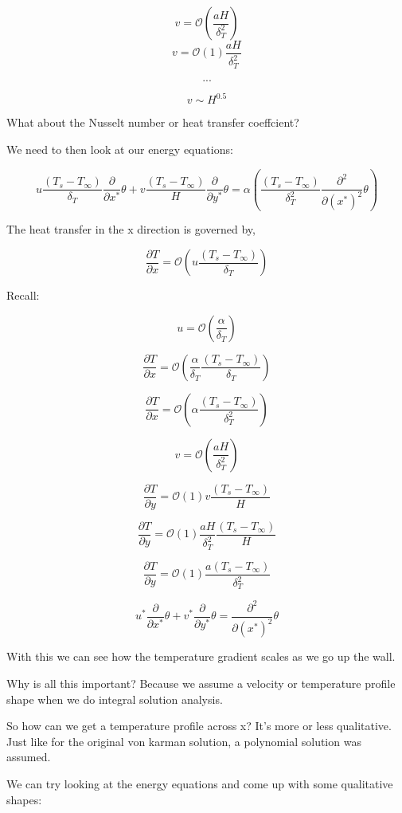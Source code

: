 \documentclass[11pt]{article}
\begin{document}
$$v = \mathcal{O}(\frac{aH}{\delta_T^2})$$
$$v = \mathcal{O}(1)\frac{aH}{\delta_T^2}$$

$$...$$

$$v \sim H^{0.5}$$

What about the Nusselt number or heat transfer coeffcient?

We need to then look at our energy equations:

$$ u \frac{(T_s - T_\infty)}{\delta_T} \frac{\partial}{\partial x^*}\theta + v \frac{(T_s - T_\infty)}{H} \frac{\partial }{\partial y^*}  \theta  = \alpha ( \frac{(T_s - T_\infty)}{\delta_T^2} \frac{\partial^2}{\partial (x^*)^2} \theta ) $$ 


The heat transfer in the x direction is governed by,

$$\frac{\partial T}{\partial x} = \mathcal{O}( u \frac{(T_s - T_\infty)}{\delta_T})$$

Recall:

$$u  = \mathcal{O}(\frac{\alpha}{\delta_T})$$

$$\frac{\partial T}{\partial x} = \mathcal{O}( \frac{\alpha}{\delta_T} \frac{(T_s - T_\infty)}{\delta_T})$$

$$\frac{\partial T}{\partial x} = \mathcal{O}( \alpha \frac{(T_s - T_\infty)}{\delta_T^2})$$

$$v = \mathcal{O}(\frac{aH}{\delta_T^2})$$

$$\frac{\partial T}{\partial y} = \mathcal{O}(1) v \frac{(T_s - T_\infty)}{H}  $$

$$\frac{\partial T}{\partial y} = \mathcal{O}(1) \frac{aH}{\delta_T^2} \frac{(T_s - T_\infty)}{H}  $$

$$\frac{\partial T}{\partial y} = \mathcal{O}(1) \frac{a(T_s - T_\infty)}{\delta_T^2}  $$


$$ u^* \frac{\partial}{\partial x^*}\theta + v^* \frac{\partial }{\partial y^*}  \theta  = \frac{\partial^2}{\partial (x^*)^2} \theta  $$ 


With this we can see how the temperature gradient scales as we go up the wall. 

Why is all this important? Because we assume a velocity or temperature profile shape when we do integral solution analysis. 

So how can we get a temperature profile across x? It's more or less qualitative. Just like for the original von karman solution, a polynomial solution was assumed.

We can try looking at the energy equations and come up with some qualitative shapes:
\end{document}
